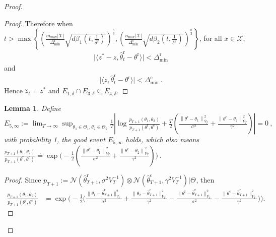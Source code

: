 \documentclass[accepted]{uai2025} %
\theoremstyle{plain}
\newtheorem{lemma}[theorem]{Lemma}
\theoremstyle{definition}
\theoremstyle{remark}
\newcommand{\Deltac}{\Delta^{\mathrm{c}}}
\newcommand{\Deltar}{\Delta^{\mathrm{r}}}
\newcommand{\thetar}{\theta^{\mathrm{r}}}
\newcommand{\truethetac}{\theta^{\mathrm{c}}}
\newcommand{\truethetar}{\theta^{\mathrm{r}}}
\newcommand{\hthetart}{\hat{\theta}_t^{\mathrm{r}}}
\newcommand{\cbr}[1]{\left\{#1\right\}}
\begin{document}
\begin{proof}
\begin{proof}
Therefore when $t> \max \cbr{(\frac{m_\text{max} |\mathcal{X}| }{\Deltar_\text{min}} \sqrt{d\beta_1 (t, \frac{1}{\delta^2})})^{\frac{8}{3}}, (\frac{ n_\text{max}|\mathcal{X}|}{\Deltac_\text{min}}\sqrt{d\beta_2 (t, \frac{1}{\delta^2})})^{\frac{8}{3}}}$, 
for all $x\in\mathcal{X}$,
\begin{align*}
    \lvert\langle z^*-z, \hthetart - \thetar \rangle\rvert< \Deltar_\text{min}
\end{align*}
and
\begin{align*}
    \lvert\langle z, \hthetart - \thetar \rangle\rvert< \Deltac_\text{min}~.
\end{align*}
Hence $\hat{z}_t=z^*$ and 
$E_{1,\delta}\cap E_{3,\delta} \subseteq E_{4,\delta}$.
\end{proof}

\begin{lemma}
    
    Define $E_{5,\infty}:=\lim_{T\to \infty}\sup_{\theta_1 \in \Theta_1, \theta_2\in\Theta_2} \frac{1}{T} \left| 
\log \frac{p_{T+1}(\theta_1, \theta_2)}{p_{T+1}(\truethetar,\truethetac)} 
+ \frac{T}{2} (\frac{\left\| \truethetar - \theta_1 \right\|^2_{\overline{V}_T}}{\sigma^2}+\frac{\left\| \truethetac - \theta_2 \right\|^2_{\overline{V}_T}}{\gamma^2})  
\right| =0~,$  with probability 1, the good event $E_{5,\infty}$ holds, which also means $\frac{p_{T+1}(\theta_1, \theta_2)}{p_{T+1}(\truethetar,\truethetac)}\stackrel{\cdot}{=}\exp \bigg( -\frac{1}{2} (\frac{\left\| \truethetar - \theta_1 \right\|^2_{{V}_T}}{\sigma^2}+\frac{\left\| \truethetac - \theta_2 \right\|^2_{{V}_T}}{\gamma^2})\bigg)~.$
\end{lemma}
\begin{proof}
  Since $p_{T+1}:=\mathcal{N}(\hat{\theta}^\mathrm{r}_{T+1}, \sigma^2 V_{T}^{-1})\otimes \mathcal{N}(\hat{\theta}^\mathrm{c}_{T+1}, \gamma^2 V_{T}^{-1}) | \Theta_{}$, then 
    \begin{align*}
\frac{p_{T+1}(\theta_1, \theta_2)}{p_{T+1}(\truethetar,\truethetac)}&= \exp\bigg(-\frac{1}{2} \Big(\frac{\lVert\theta_1-\hat{\theta}^\mathrm{r}_{T+1}\rVert^2_{V_{T}}}{\sigma^2}+\frac{\lVert\theta_2-\hat{\theta}^\mathrm{c}_{T+1}\rVert^2_{V_{T}}}{\gamma^2}-\frac{\lVert\truethetar-\hat{\theta}^\mathrm{r}_{T+1}\rVert^2_{V_{T}}}{\sigma^2}-\frac{\lVert\truethetac-\hat{\theta}^\mathrm{r}_{T+1}\rVert^2_{V_{T}}}{\gamma^2}\Big) \bigg).
    \end{align*} 


\end{proof}
\end{proof}
\end{document}
